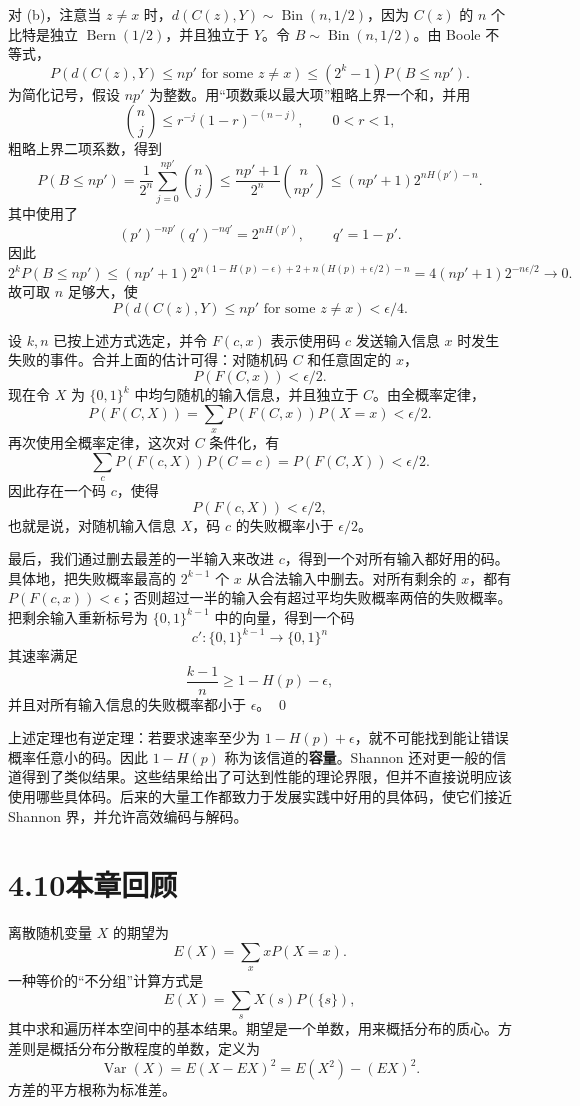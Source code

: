 \documentclass[UTF8,12pt,a4paper,fontset=fandol]{ctexart}
\begin{document}
对 (b)，注意当 $z\ne x$ 时，$d(C(z),Y)\sim\operatorname{Bin}(n,1/2)$，因为 $C(z)$ 的 $n$ 个比特是独立 $\operatorname{Bern}(1/2)$，并且独立于 $Y$。令 $B\sim\operatorname{Bin}(n,1/2)$。由 Boole 不等式，
\[
  P(d(C(z),Y)\le np'\text{ for some }z\ne x)
  \le (2^k-1)P(B\le np').
\]
为简化记号，假设 $np'$ 为整数。用“项数乘以最大项”粗略上界一个和，并用
\[
  \binom{n}{j}\le r^{-j}(1-r)^{-(n-j)},\qquad 0<r<1,
\]
粗略上界二项系数，得到
\[
  P(B\le np')
  =\frac{1}{2^n}\sum_{j=0}^{np'}\binom{n}{j}
  \le \frac{np'+1}{2^n}\binom{n}{np'}
  \le (np'+1)2^{nH(p')-n}.
\]
其中使用了
\[
  (p')^{-np'}(q')^{-nq'}=2^{nH(p')},\qquad q'=1-p'.
\]
因此
\[
  2^kP(B\le np')
  \le (np'+1)2^{n(1-H(p)-\epsilon)+2+n(H(p)+\epsilon/2)-n}
  =4(np'+1)2^{-n\epsilon/2}\to 0.
\]
故可取 $n$ 足够大，使
\[
  P(d(C(z),Y)\le np'\text{ for some }z\ne x)<\epsilon/4.
\]

设 $k,n$ 已按上述方式选定，并令 $F(c,x)$ 表示使用码 $c$ 发送输入信息 $x$ 时发生失败的事件。合并上面的估计可得：对随机码 $C$ 和任意固定的 $x$，
\[
  P(F(C,x))<\epsilon/2.
\]
现在令 $X$ 为 $\{0,1\}^k$ 中均匀随机的输入信息，并且独立于 $C$。由全概率定律，
\[
  P(F(C,X))=\sum_x P(F(C,x))P(X=x)<\epsilon/2.
\]
再次使用全概率定律，这次对 $C$ 条件化，有
\[
  \sum_c P(F(c,X))P(C=c)=P(F(C,X))<\epsilon/2.
\]
因此存在一个码 $c$，使得
\[
  P(F(c,X))<\epsilon/2,
\]
也就是说，对随机输入信息 $X$，码 $c$ 的失败概率小于 $\epsilon/2$。

最后，我们通过删去最差的一半输入来改进 $c$，得到一个对所有输入都好用的码。具体地，把失败概率最高的 $2^{k-1}$ 个 $x$ 从合法输入中删去。对所有剩余的 $x$，都有 $P(F(c,x))<\epsilon$；否则超过一半的输入会有超过平均失败概率两倍的失败概率。把剩余输入重新标号为 $\{0,1\}^{k-1}$ 中的向量，得到一个码
\[
  c':\{0,1\}^{k-1}\to\{0,1\}^n
\]
其速率满足
\[
  \frac{k-1}{n}\ge 1-H(p)-\epsilon,
\]
并且对所有输入信息的失败概率都小于 $\epsilon$。 \qed

上述定理也有逆定理：若要求速率至少为 $1-H(p)+\epsilon$，就不可能找到能让错误概率任意小的码。因此 $1-H(p)$ 称为该信道的\textbf{容量}。Shannon 还对更一般的信道得到了类似结果。这些结果给出了可达到性能的理论界限，但并不直接说明应该使用哪些具体码。后来的大量工作都致力于发展实践中好用的具体码，使它们接近 Shannon 界，并允许高效编码与解码。

\section*{4.10\quad 本章回顾}

离散随机变量 $X$ 的期望为
\[
  E(X)=\sum_x xP(X=x).
\]
一种等价的“不分组”计算方式是
\[
  E(X)=\sum_s X(s)P(\{s\}),
\]
其中求和遍历样本空间中的基本结果。期望是一个单数，用来概括分布的质心。方差则是概括分布分散程度的单数，定义为
\[
  \operatorname{Var}(X)=E(X-EX)^2=E(X^2)-(EX)^2.
\]
方差的平方根称为标准差。
\end{document}

